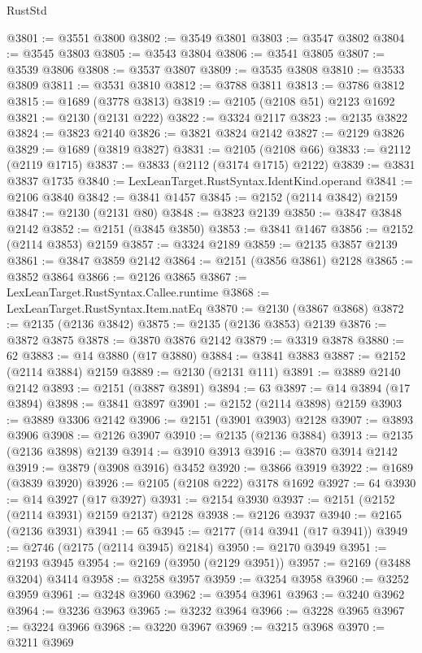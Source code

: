 \begin{lexlean}{RustStd}
\begin{coremodule}
{\begin{coremodule}
{{{{{{{{{{{{{{{{@3801 := @3551 @3800
@3802 := @3549 @3801
@3803 := @3547 @3802
@3804 := @3545 @3803
@3805 := @3543 @3804
@3806 := @3541 @3805
@3807 := @3539 @3806
@3808 := @3537 @3807
@3809 := @3535 @3808
@3810 := @3533 @3809
@3811 := @3531 @3810
@3812 := @3788 @3811
@3813 := @3786 @3812
@3815 := @1689 (@3778 @3813)
@3819 := @2105 (@2108 @51) @2123 @1692
@3821 := @2130 (@2131 @222)
@3822 := @3324 @2117
@3823 := @2135 @3822
@3824 := @3823 @2140
@3826 := @3821 @3824 @2142
@3827 := @2129 @3826
@3829 := @1689 (@3819 @3827)
@3831 := @2105 (@2108 @66)
@3833 := @2112 (@2119 @1715)
@3837 := @3833 (@2112 (@3174 @1715) @2122)
@3839 := @3831 @3837 @1735
@3840 := LexLeanTarget.RustSyntax.IdentKind.operand
@3841 := @2106 @3840
@3842 := @3841 @1457
@3845 := @2152 (@2114 @3842) @2159
@3847 := @2130 (@2131 @80)
@3848 := @3823 @2139
@3850 := @3847 @3848 @2142
@3852 := @2151 (@3845 @3850)
@3853 := @3841 @1467
@3856 := @2152 (@2114 @3853) @2159
@3857 := @3324 @2189
@3859 := @2135 @3857 @2139
@3861 := @3847 @3859 @2142
@3864 := @2151 (@3856 @3861) @2128
@3865 := @3852 @3864
@3866 := @2126 @3865
@3867 := LexLeanTarget.RustSyntax.Callee.runtime
@3868 := LexLeanTarget.RustSyntax.Item.natEq
@3870 := @2130 (@3867 @3868)
@3872 := @2135 (@2136 @3842)
@3875 := @2135 (@2136 @3853) @2139
@3876 := @3872 @3875
@3878 := @3870 @3876 @2142
@3879 := @3319 @3878
@3880 := 62
@3883 := @14 @3880 (@17 @3880)
@3884 := @3841 @3883
@3887 := @2152 (@2114 @3884) @2159
@3889 := @2130 (@2131 @111)
@3891 := @3889 @2140 @2142
@3893 := @2151 (@3887 @3891)
@3894 := 63
@3897 := @14 @3894 (@17 @3894)
@3898 := @3841 @3897
@3901 := @2152 (@2114 @3898) @2159
@3903 := @3889 @3306 @2142
@3906 := @2151 (@3901 @3903) @2128
@3907 := @3893 @3906
@3908 := @2126 @3907
@3910 := @2135 (@2136 @3884)
@3913 := @2135 (@2136 @3898) @2139
@3914 := @3910 @3913
@3916 := @3870 @3914 @2142
@3919 := @3879 (@3908 @3916) @3452
@3920 := @3866 @3919
@3922 := @1689 (@3839 @3920)
@3926 := @2105 (@2108 @222) @3178 @1692
@3927 := 64
@3930 := @14 @3927 (@17 @3927)
@3931 := @2154 @3930
@3937 := @2151 (@2152 (@2114 @3931) @2159 @2137) @2128
@3938 := @2126 @3937
@3940 := @2165 (@2136 @3931)
@3941 := 65
@3945 := @2177 (@14 @3941 (@17 @3941))
@3949 := @2746 (@2175 (@2114 @3945) @2184)
@3950 := @2170 @3949
@3951 := @2193 @3945
@3954 := @2169 (@3950 (@2129 @3951))
@3957 := @2169 (@3488 @3204) @3414
@3958 := @3258 @3957
@3959 := @3254 @3958
@3960 := @3252 @3959
@3961 := @3248 @3960
@3962 := @3954 @3961
@3963 := @3240 @3962
@3964 := @3236 @3963
@3965 := @3232 @3964
@3966 := @3228 @3965
@3967 := @3224 @3966
@3968 := @3220 @3967
@3969 := @3215 @3968
@3970 := @3211 @3969
}}}}}}}}}}}}}}}}
\end{coremodule}}
\end{coremodule}
\end{lexlean}
